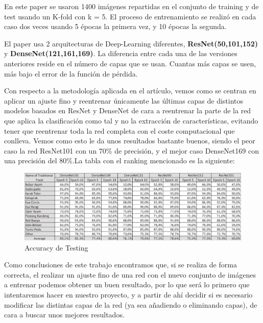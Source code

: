 \vspace{3 mm}

En este paper se usaron 1400 imágenes repartidas en el conjunto de training y de test usando un K-fold con k = 5. El proceso de entrenamiento se realizó en cada caso dos veces usando 5 épocas la primera vez, y 10 épocas la segunda.

\vspace{3 mm}

El paper usa 2 arquitecturas de Deep-Learning diferentes, \textbf{ResNet(50,101,152)} y \textbf{DenseNet(121,161,169)}. La diferencia entre cada una de las versiones anteriores reside en el número de capas que se usan. Cuantas más capas se usen, más bajo el error de la función de pérdida.

Con respecto a la metodología aplicada en el artículo, vemos como se centran en aplicar un ajuste fino y reentrenar únicamente las últimas capas de distintos modelos basados en ResNet y DenseNet de cara a reentrenar la parte de la red que aplica la clasificación como tal y no la extracción de características, evitando tener que reentrenar toda la red completa con el coste computacional que conlleva. Vemos como esto le da unos resultados bastante buenos, siendo el peor caso la red ResNet101 con un 70\% de precisión, y el mejor caso DenseNet169 con una precisión del 80\%.La tabla con el ranking mencionado es la siguiente:

\vspace{5 mm}

\begin{figure}[H]
  \centering
  \includegraphics[width=1\linewidth]{Imagenes/tablapaper1.png}
  \caption{Accuracy de Testing}
  \label{fig:sub-first}
\end{figure}

\vspace{5 mm}


Como conclusiones de este trabajo encontramos que, si se realiza de forma correcta, el realizar un ajuste fino de una red con el nuevo conjunto de imágenes a entrenar podemos obtener un buen resultado, por lo que será lo primero que intentaremos hacer en nuestro proyecto, y a partir de ahí decidir si es necesario modificar las distintas capas de la red (ya sea añadiendo o eliminando capas), de cara a buscar unos mejores resultados.

